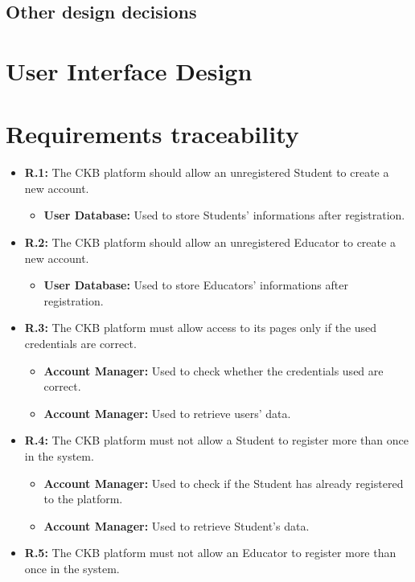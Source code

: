 \documentclass{article}
\begin{document}
{\begin{itemize}
\subsection{Other design decisions}
\section{User Interface Design}
\section{Requirements traceability}
\begin{itemize}
    \item \textbf{R.1:} The CKB platform should allow an
        unregistered Student to create a new account.
        \begin{itemize}
            \item \textbf{User Database:} Used to store Students' informations after registration.
        \end{itemize}
    \item \textbf{R.2:} The CKB platform should allow an
        unregistered Educator to create a new account.
        \begin{itemize}
            \item \textbf{User Database:} Used to store Educators' informations after registration.
        \end{itemize}
    \item \textbf{R.3:} The CKB platform must allow access to its pages only if the used credentials are correct.
        \begin{itemize}
            \item \textbf{Account Manager:} Used to check whether the credentials used are correct.
            \item \textbf{Account Manager:} Used to retrieve users' data.
        \end{itemize}
    \item \textbf{R.4:} The CKB platform must not allow a Student to register more than once in the system.
          \begin{itemize}
              \item \textbf{Account Manager:} Used to check if the Student has 
              already registered to the platform.
              \item \textbf{Account Manager:} Used to retrieve Student's data.
          \end{itemize}
    \item \textbf{R.5:} The CKB platform must not allow an Educator to register more than once in the system.

\end{itemize}
\end{itemize}}
\end{document}

